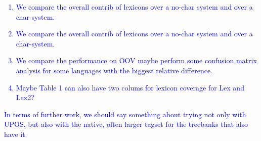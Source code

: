 \documentclass[11pt,letterpaper]{article}
\begin{document}
\textcolor{blue}{
\begin{enumerate}
\item We compare the overall contrib of lexicons over a no-char system and over a char-system.
\item We compare the overall contrib of lexicons over a no-char system and over a char-system.
\item We compare the performance on OOV maybe perform some confusion matrix analysis for some languages with the biggest relative difference.
\item Maybe Table 1 can also have two colums for lexicon coverage for Lex and Lex2?
\end{enumerate}
In terms of further work, we should say something about trying not only with UPOS, but also with the native, often larger tagset for the treebanks that also have it.
}







\end{document}
